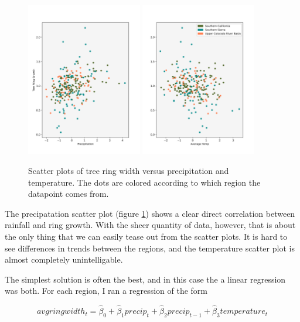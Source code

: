 \documentclass[]{article}
\begin{document}
\begin{figure}
	\centering
	\includegraphics[width=0.45\textwidth]{precip_scatter.png}
	\includegraphics[width=0.45\textwidth]{temp_scatter.png}
	\caption{Scatter plots of tree ring width versus precipitation and temperature. The dots are colored according to which region the datapoint comes from. }
	\label{fig:weather_scatter}
\end{figure} 

The precipatation scatter plot (figure \ref{fig:weather_scatter}) shows a clear direct correlation between rainfall and ring growth. With the sheer quantity of data, however, that is about the only thing that we can easily tease out from the scatter plots. It is hard to see differences in trends between the regions, and the temperature scatter plot is almost completely unintelligable.

The simplest solution is often the  best, and in this case the a linear regression was both. For each region, I ran a regression of the form

\begin{equation}
avgringwidth_t = \hat{\beta}_0 + \hat{\beta}_1 precip_t + \hat{\beta}_2 precip_{t-1} + \hat{\beta}_3 temperature_t
\label{eq:linreg}
\end{equation}
\end{document}
